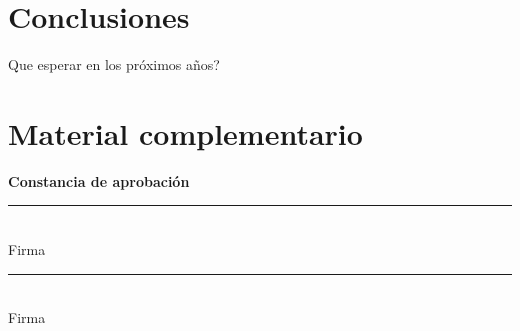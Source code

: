 \documentclass[12pt,a4paper]{report}
\begin{document}
\chapter{Conclusiones}
Que esperar en los próximos años?


\printbibliography[heading=bibintoc,title={Bibliografía}]

\appendix

\chapter{Material complementario}

\clearpage
\thispagestyle{empty}

\vspace*{\fill}

\begin{center}
    \Large\textbf{Constancia de aprobación}
\end{center}

\vspace{1cm}


\vspace{3cm}

\noindent
\begin{minipage}{0.45\textwidth}
    \centering
    \rule{6cm}{0.4pt}\\
    Firma
\end{minipage}
\hfill
\begin{minipage}{0.45\textwidth}
    \centering
    \rule{6cm}{0.4pt}\\
    Firma
\end{minipage}

\vspace*{\fill}

\clearpage
\thispagestyle{empty}
\mbox{}
\end{document}
